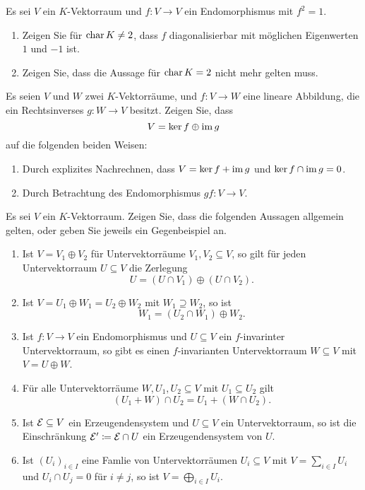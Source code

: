 \documentclass[a4paper,10pt]{scrartcl}
\begin{document}
\begin{question}
  Es sei $V$ ein $K$-Vektorraum und $f \colon V \to V$ ein Endomorphismus mit $f^2 = 1$.
  \begin{enumerate}[leftmargin=*]
    \item
      Zeigen Sie für $\operatorname{char} K \neq 2$, dass $f$ diagonalisierbar mit möglichen Eigenwerten $1$ und $-1$ ist.
    \item
      Zeigen Sie, dass die Aussage für $\operatorname{char} K = 2$ nicht mehr gelten muss.
  \end{enumerate}
\end{question}


\begin{question}
  Es seien $V$ und $W$ zwei $K$-Vektorräume, und $f \colon V \to W$ eine lineare Abbildung, die ein Rechtsinverses $g \colon W \to V$ besitzt.
  Zeigen Sie, dass
  \[
    V = \ker f \oplus \operatorname{im} g
  \]
  auf die folgenden beiden Weisen:
  \begin{enumerate}[leftmargin=*]
    \item
      Durch explizites Nachrechnen, dass $V = \ker f + \operatorname{im} g$ und $\ker f \cap \operatorname{im} g = 0$.
    \item
      Durch Betrachtung des Endomorphismus $gf \colon V \to V$.
  \end{enumerate}
\end{question}


\begin{question}
  Es sei $V$ ein $K$-Vektorraum.
  Zeigen Sie, dass die folgenden Aussagen allgemein gelten, oder geben Sie jeweils ein Gegenbeispiel an.
  \begin{enumerate}[leftmargin=*]
    \item
      Ist $V = V_1 \oplus V_2$ für Untervektorräume $V_1, V_2 \subseteq V$, so gilt für jeden Untervektorraum $U \subseteq V$ die Zerlegung
      \[
        U = (U \cap V_1) \oplus (U \cap V_2).
      \]
    \item
      Ist $V = U_1 \oplus W_1 = U_2 \oplus W_2$ mit $W_1 \supseteq W_2$, so ist
      \[
        W_1 = (U_2 \cap W_1) \oplus W_2.
      \]
    \item
      Ist $f \colon V \to V$ ein Endomorphismus und $U \subseteq V$ ein $f$-invarinter Untervektorraum, so gibt es einen $f$-invarianten Untervektorraum $W \subseteq V$ mit $V = U \oplus W$.
    \item
      Für alle Untervektorräume $W, U_1, U_2 \subseteq V$ mit $U_1 \subseteq U_2$ gilt
      \[
        (U_1 + W) \cap U_2 =  U_1 + (W \cap U_2).
      \]
    \item
      Ist $\mathcal{E} \subseteq V$ ein Erzeugendensystem und $U \subseteq V$ ein Untervektorraum, so ist die Einschränkung $\mathcal{E}' \coloneqq \mathcal{E} \cap U$ ein Erzeugendensystem von $U$.
    \item
      Ist $(U_i)_{i \in I}$ eine Famlie von Untervektorräumen $U_i \subseteq V$ mit $V = \sum_{i \in I} U_i$ und $U_i \cap U_j = 0$ für $i \neq j$, so ist $V = \bigoplus_{i \in I} U_i$.
  \end{enumerate}
\end{question}
\end{document}
